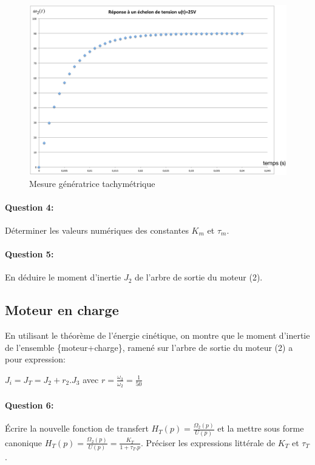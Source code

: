 \begin{figure}[!h]
 \centering\includegraphics[width=0.8\linewidth]{img/fig_moteur_charge_02}
  \caption{Mesure génératrice tachymétrique}
 \label{fig_moteur_charge_02}
\end{figure}

\paragraph{Question 4:} Déterminer les valeurs numériques des constantes $K_m$ et $\tau_m$.

\paragraph{Question 5:} En déduire le moment d'inertie $J_2$ de l'arbre de sortie du moteur (2).

\newpage

\subsection{Moteur en charge}

En utilisant le théorème de l'énergie cinétique, on montre que le moment d'inertie de l'ensemble \{moteur+charge\}, ramené sur l'arbre de sortie du moteur (2) a pour expression:

$J_i=J_T=J_2+r_2.J_3$ avec $r=\frac{\omega_3}{\omega_2}=\frac{1}{50}$

\paragraph{Question 6:} Écrire la nouvelle fonction de transfert
$H_T(p)=\frac{\Omega_2(p)}{U(p)}$ et la mettre sous forme canonique
$H_T(p)=\frac{\Omega_2(p)}{U(p)}=\frac{K_T}{1+\tau_T.p}$. Préciser les expressions littérale de $K_T$ et $\tau_T$.

